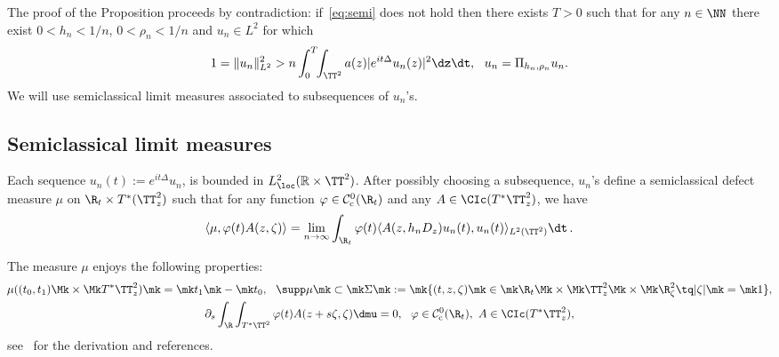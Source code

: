 The proof of the Proposition proceeds by contradiction: if~\eqref{eq:semi} does not hold then there exists $ T > 0 $ such that for any $ n \in \NN $ there exist $ 0 < h_n < 1/n $, $ 0 < \rho_n < 1/n $ and $ u_n \in L^2 $ for which
\begin{equation}\label{eq:contr}
1 = \| u_n \|_{ L^2 }^2 > n \int_0^T \!\!\int_{ \TT^2} a (z) | e^{ i t \Delta} u_n (z) |^2 \dz \dt, \ \ u_n = \Pi_{ h_n, \rho_n } u_n.
\end{equation}
We will use semiclassical limit measures associated to subsequences of $ u_n$'s.

\subsection{Semiclassical limit measures}

Each sequence $ u_n (t) := e^{ i t \Delta } u_n $, is bounded in $L^2_{\loc} (\mathbb{R} \times \TT^2)$. After possibly choosing a subsequence, $ u_n $'s define a semiclassical defect measure $\mu $ on $\R_t \times T^* (\TT^2_z)$ such that for any function $\varphi \in {\mathcal C}^0_{\mathrm{c}} (\R_t)$ and any $A\in \CIc (T^*\TT^2_z)$, we have
\begin{equation}\label{eq:mu}
\langle \mu, \varphi(t) A(z, \zeta)\rangle = \lim_{n\rightarrow \infty} \int_{\R_t } \varphi(t)
\langle A(z, h_{n} D_z) u_{n} (t), u_n (t)
\rangle_{ L^2 (\TT^2) } \dt \,.
\end{equation}

The measure $ \mu $ enjoys the following properties:
\begin{gather}\label{eq:propmu}
\begin{gathered}
\!\mu ((t_0, t_1) \Mk\times\Mk T^*\TT^2_z) \mk=\mk t_1 \mk-\mk t_0, \ \
\supp \mu \mk\subset\mk \Sigma \mk:=\mk \{(t,z, \zeta) \mk\in\mk \R_t \Mk\times\Mk \TT^2_z \Mk\times\Mk \R^2_\zeta \tq |\zeta|\mk=\mk 1\},\! \\
\partial_s \int_{\R} \int_{ T^* \TT^2 } \varphi(t) A (z + s \zeta, \zeta) \dmu = 0,
\ \ \varphi \in {\mathcal C}^0_{\mathrm{c}} (\R_t), \ A \in \CIc (T^*\TT^2_z),
\end{gathered}
\end{gather}
see~\cite{Ma} for the derivation and references.

